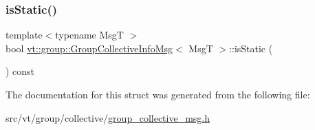 \subsubsection{\texorpdfstring{is\+Static()}{isStatic()}}
{\footnotesize\ttfamily template$<$typename MsgT $>$ \\
bool \hyperlink{structvt_1_1group_1_1_group_collective_info_msg}{vt\+::group\+::\+Group\+Collective\+Info\+Msg}$<$ MsgT $>$\+::is\+Static (\begin{DoxyParamCaption}{ }\end{DoxyParamCaption}) const\hspace{0.3cm}{\ttfamily [inline]}}



The documentation for this struct was generated from the following file\+:\begin{DoxyCompactItemize}
\item 
src/vt/group/collective/\hyperlink{group__collective__msg_8h}{group\+\_\+collective\+\_\+msg.\+h}\end{DoxyCompactItemize}
